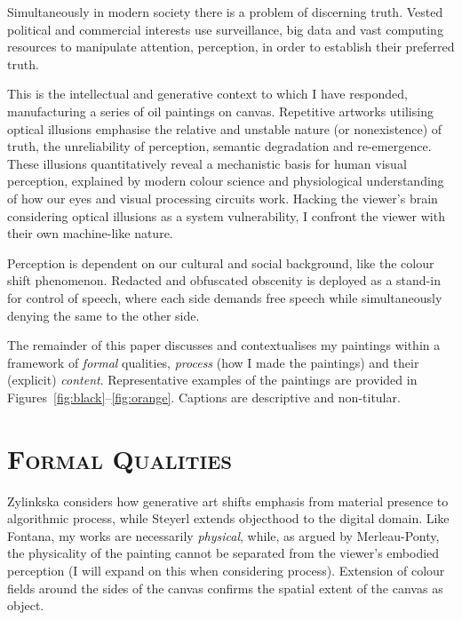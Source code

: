 \documentclass[12pt]{article}
\begin{document}
Simultaneously in modern society there is a problem of discerning
truth.\cite{keyes2004posttruth,mcintyre2018posttruth}  Vested
political and commercial interests use surveillance, big data and vast
computing resources to manipulate attention, perception, in order to
establish their preferred truth.

This is the intellectual and generative context to which I have
responded, manufacturing a series of oil paintings on
canvas. Repetitive artworks utilising optical illusions emphasise the
relative and unstable nature (or nonexistence) of truth, the
unreliability of perception, semantic degradation and
re-emergence. These illusions quantitatively reveal a mechanistic
basis for human visual perception, explained by modern colour science
and physiological understanding of how our eyes and visual processing
circuits work. Hacking the viewer's brain considering optical
illusions as a system vulnerability, I confront the viewer with their
own machine-like nature.

Perception is dependent on our cultural and social background, like
the colour shift phenomenon.  Redacted and obfuscated obscenity is
deployed as a stand-in for control of speech, where each side demands
free speech while simultaneously denying the same to the other side.

The remainder of this paper discusses and contextualises my paintings
within a framework of \emph{formal} qualities, \emph{process} (how I
made the paintings) and their (explicit)
\emph{content}. Representative examples of the paintings are provided
in Figures~\ref{fig:black}--\ref{fig:orange}. Captions are descriptive
and non-titular.

\section{\textsc{Formal Qualities}}
Zylinkska considers how generative art shifts emphasis from material
presence to algorithmic process,\cite{zylinska2020ai} while Steyerl
extends objecthood to the digital domain.\cite{steyerl2017duty} Like
Fontana, my works are necessarily
\emph{physical},\cite{fontana1947spatial} while, as argued by
Merleau-Ponty, the physicality of the painting cannot be separated
from the viewer's embodied perception (I will expand on this when
considering process).\cite{merleauponty1964eye} Extension of colour
fields around the sides of the canvas confirms the spatial extent of
the canvas as object.
\end{document}
